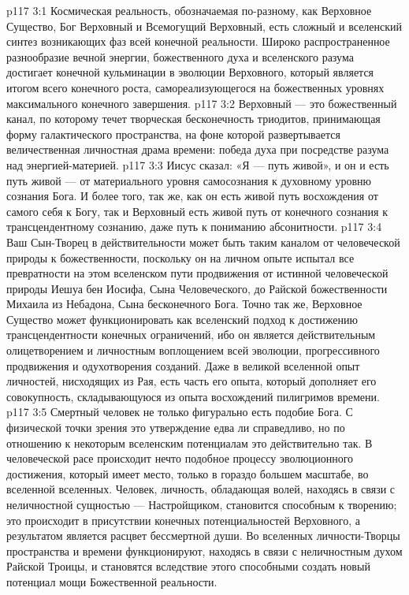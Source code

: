 \vs p117 3:1 Космическая реальность, обозначаемая по\hyp{}разному, как Верховное Существо, Бог Верховный и Всемогущий Верховный, есть сложный и вселенский синтез возникающих фаз всей конечной реальности. Широко распространенное разнообразие вечной энергии, божественного духа и вселенского разума достигает конечной кульминации в эволюции Верховного, который является итогом всего конечного роста, самореализующегося на божественных уровнях максимального конечного завершения.
\vs p117 3:2 Верховный --- это божественный канал, по которому течет творческая бесконечность триодитов, принимающая форму галактического пространства, на фоне которой развертывается величественная личностная драма времени: победа духа при посредстве разума над энергией\hyp{}материей.
\vs p117 3:3 \pc Иисус сказал: «Я --- путь живой», и он и есть путь живой --- от материального уровня самосознания к духовному уровню сознания Бога. И более того, так же, как он есть живой путь восхождения от самого себя к Богу, так и Верховный есть живой путь от конечного сознания к трансцендентному сознанию, даже путь к пониманию абсонитности.
\vs p117 3:4 Ваш Сын\hyp{}Творец в действительности может быть таким каналом от человеческой природы к божественности, поскольку он на личном опыте испытал все превратности на этом вселенском пути продвижения от истинной человеческой природы Иешуа бен Иосифа, Сына Человеческого, до Райской божественности Михаила из Небадона, Сына бесконечного Бога. Точно так же, Верховное Существо может функционировать как вселенский подход к достижению трансцендентности конечных ограничений, ибо он является действительным олицетворением и личностным воплощением всей эволюции, прогрессивного продвижения и одухотворения созданий. Даже в великой вселенной опыт личностей, нисходящих из Рая, есть часть его опыта, который дополняет его совокупность, складывающуюся из опыта восхождений пилигримов времени.
\vs p117 3:5 \pc Смертный человек не только фигурально есть подобие Бога. С физической точки зрения это утверждение едва ли справедливо, но по отношению к некоторым вселенским потенциалам это действительно так. В человеческой расе происходит нечто подобное процессу эволюционного достижения, который имеет место, только в гораздо большем масштабе, во вселенной вселенных. Человек, личность, обладающая волей, находясь в связи с неличностной сущностью --- Настройщиком, становится способным к творению; это происходит в присутствии конечных потенциальностей Верховного, а результатом является расцвет бессмертной души. Во вселенных личности\hyp{}Творцы пространства и времени функционируют, находясь в связи с неличностным духом Райской Троицы, и становятся вследствие этого способными создать новый потенциал мощи Божественной реальности.
